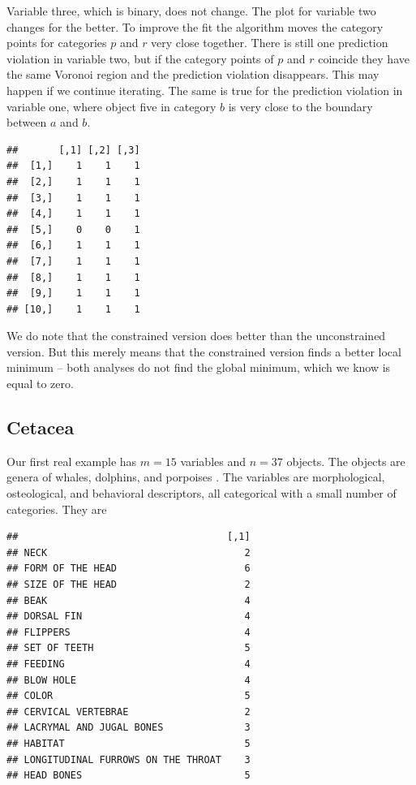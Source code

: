 \documentclass[
  12pt,
]{article}
\begin{document}
Variable three, which is binary, does not change. The plot for variable two changes for the better. To improve the fit the algorithm moves the
category points for categories \(p\) and \(r\) very close together. There is
still one prediction violation in variable two, but
if the category points of \(p\) and \(r\) coincide they have the same Voronoi
region and the prediction violation disappears. This may happen if we
continue iterating. The same is true for the prediction violation in
variable one, where object five in category \(b\) is very close to the
boundary between \(a\) and \(b\).

\begin{verbatim}
##       [,1] [,2] [,3]
##  [1,]    1    1    1
##  [2,]    1    1    1
##  [3,]    1    1    1
##  [4,]    1    1    1
##  [5,]    0    0    1
##  [6,]    1    1    1
##  [7,]    1    1    1
##  [8,]    1    1    1
##  [9,]    1    1    1
## [10,]    1    1    1
\end{verbatim}

We do note that the constrained version does better than the
unconstrained version. But this merely means that the constrained
version finds a better local minimum -- both analyses do not
find the global minimum, which we know is equal to zero.

\subsection{Cetacea}\label{cetacea}

Our first real example has \(m=15\) variables and \(n=37\) objects. The
objects are genera of whales, dolphins, and porpoises . The variables are morphological, osteological, and behavioral descriptors,
all categorical with a small number of categories. They are

\begin{verbatim}
##                                    [,1]
## NECK                                  2
## FORM OF THE HEAD                      6
## SIZE OF THE HEAD                      2
## BEAK                                  4
## DORSAL FIN                            4
## FLIPPERS                              4
## SET OF TEETH                          5
## FEEDING                               4
## BLOW HOLE                             4
## COLOR                                 5
## CERVICAL VERTEBRAE                    2
## LACRYMAL AND JUGAL BONES              3
## HABITAT                               5
## LONGITUDINAL FURROWS ON THE THROAT    3
## HEAD BONES                            5
\end{verbatim}
\end{document}
